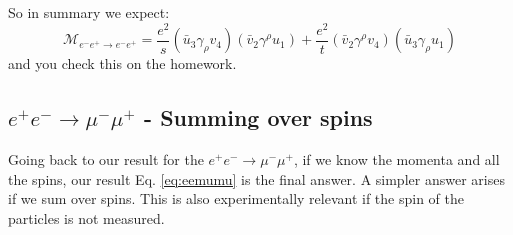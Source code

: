 So in summary we expect:
\begin{equation}
    \mathcal{M}_{e^-e^+ \to e^-e^+} = \frac{e^2}{s}(\bar{u}_3\gamma_\rho v_4)(\bar{v}_2\gamma^\rho u_1) + \frac{e^2}{t}(\bar{v}_2\gamma^\rho v_4)(\bar{u}_3\gamma_\rho u_1)
\end{equation}
and you check this on the homework.

\subsection{$e^+e^-\to\mu^-\mu^+$ - Summing over spins}
Going back to our result for the $e^+e^-\to\mu^-\mu^+$, if we know the momenta and all the spins, our result Eq. \eqref{eq:eemumu} is the final answer. A simpler answer arises if we sum over spins. This is also experimentally relevant if the spin of the particles is not measured.

